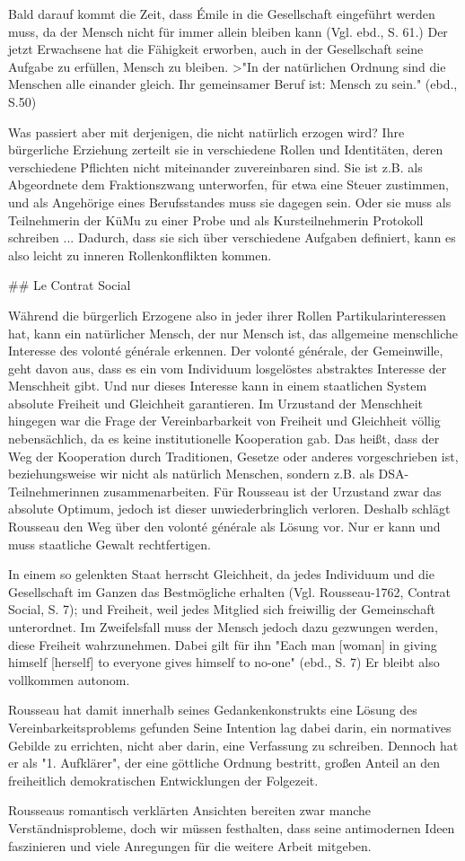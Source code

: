 Bald darauf kommt die Zeit, dass Émile in die Gesellschaft eingeführt werden muss, da der Mensch nicht für immer allein bleiben kann (Vgl. ebd., S. 61.)
Der jetzt Erwachsene hat die Fähigkeit erworben, auch in der Gesellschaft seine Aufgabe zu erfüllen, Mensch zu bleiben.
>"In der natürlichen Ordnung sind die Menschen alle einander gleich. Ihr gemeinsamer Beruf ist: Mensch zu sein."
(ebd., S.50)

Was passiert aber mit derjenigen, die nicht natürlich erzogen wird?
Ihre bürgerliche Erziehung zerteilt sie in verschiedene Rollen und Identitäten, deren verschiedene Pflichten nicht miteinander zuvereinbaren sind.
Sie ist z.B. als Abgeordnete dem Fraktionszwang unterworfen, für etwa eine Steuer zustimmen, und als Angehörige eines Berufsstandes muss sie dagegen sein.
Oder sie muss als Teilnehmerin der KüMu zu einer Probe und als Kursteilnehmerin Protokoll schreiben ...
Dadurch, dass sie sich über verschiedene Aufgaben definiert, kann es also leicht zu inneren Rollenkonflikten kommen.


## Le Contrat Social

Während die bürgerlich Erzogene also in jeder ihrer Rollen Partikularinteressen hat, kann ein natürlicher Mensch, der nur Mensch ist, das allgemeine menschliche Interesse des volonté générale erkennen.
Der volonté générale, der Gemeinwille, geht davon aus, dass es ein vom Individuum losgelöstes abstraktes Interesse der Menschheit gibt.
Und nur dieses Interesse kann in einem staatlichen System absolute Freiheit und Gleichheit garantieren.
Im Urzustand der Menschheit hingegen war die Frage der Vereinbarbarkeit von Freiheit und Gleichheit völlig nebensächlich, da es keine institutionelle Kooperation gab.
Das heißt, dass der Weg der Kooperation durch Traditionen, Gesetze oder anderes vorgeschrieben ist, beziehungsweise wir nicht als natürlich Menschen, sondern z.B. als DSA-Teilnehmerinnen zusammenarbeiten.
Für Rousseau ist der Urzustand zwar das absolute Optimum, jedoch ist dieser unwiederbringlich verloren.
Deshalb schlägt Rousseau den Weg über den volonté générale als Lösung vor.
Nur er kann und muss staatliche Gewalt rechtfertigen.

In einem so gelenkten Staat herrscht Gleichheit, da jedes Individuum und die Gesellschaft im Ganzen das Bestmögliche erhalten (Vgl. Rousseau-1762, Contrat Social, S. 7);
und Freiheit, weil jedes Mitglied sich freiwillig der Gemeinschaft unterordnet.
Im Zweifelsfall muss der Mensch jedoch dazu gezwungen werden, diese Freiheit wahrzunehmen.
Dabei gilt für ihn "Each man [woman] in giving himself [herself] to everyone gives himself to no-one" (ebd., S. 7)
Er bleibt also vollkommen autonom.

Rousseau hat damit innerhalb seines Gedankenkonstrukts eine Lösung des Vereinbarkeitsproblems gefunden
Seine Intention lag dabei darin, ein normatives Gebilde zu errichten, nicht aber darin, eine Verfassung zu schreiben.
Dennoch hat er als "1. Aufklärer", der eine göttliche Ordnung bestritt, großen Anteil an den freiheitlich demokratischen Entwicklungen der Folgezeit.

Rousseaus romantisch verklärten Ansichten bereiten zwar manche Verständnisprobleme, doch wir müssen festhalten, dass seine antimodernen Ideen faszinieren und viele Anregungen für die weitere Arbeit mitgeben.
